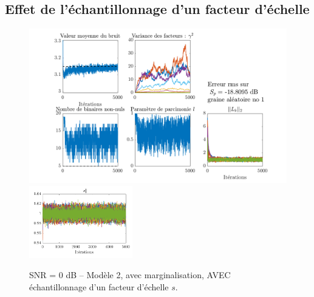 \documentclass[ 12pt]{article}
\begin{document}
\subsection{Effet de l'échantillonnage d'un facteur d'échelle}
\begin{figure}[H]
	\centering
	\includegraphics[width=\textwidth]{ToyCase/scalingon.png}\\
	\includegraphics[width=0.4\textwidth]{ToyCase/s.png}
	\caption{SNR = 0 dB -- Modèle 2, avec marginalisation, AVEC échantillonnage d'un facteur d'échelle $s$.}
\end{figure}
\end{document}
